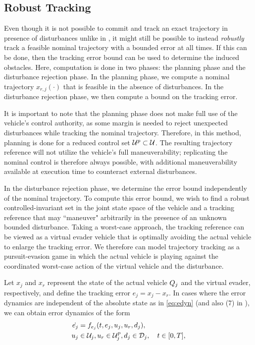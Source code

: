 \subsection{Robust Tracking} \label{sec:incomp_robust}
Even though it is not possible to commit and track an exact trajectory in presence of disturbances unlike in \cite{Chen15}, it might still be possible to instead \textit{robustly} track a feasible nominal trajectory with a bounded error at all times. If this can be done, then the tracking error bound can be used to determine the induced obstacles. Here, computation is done in two phases: the planning phase and the disturbance rejection phase. In the planning phase, we compute a nominal trajectory $x_{r,j}(\cdot)$ that is feasible in the absence of disturbances. In the disturbance rejection phase, we then compute a bound on the tracking error.

It is important to note that the planning phase does not make full use of the vehicle's control authority, as some margin is needed to reject unexpected disturbances while tracking the nominal trajectory. Therefore, in this method, planning is done for a reduced control set $\mathcal{U}^p\subset\mathcal{U}$. The resulting trajectory reference will not utilize the vehicle's full maneuverability; replicating the nominal control is therefore always possible, with additional maneuverability available at execution time to counteract external disturbances.

In the disturbance rejection phase, we determine the error bound independently of the nominal trajectory. To compute this error bound, we wish to find a robust controlled-invariant set in the joint state space of the vehicle and a tracking reference that may ``maneuver" arbitrarily in the presence of an unknown bounded disturbance. Taking a worst-case approach, the tracking reference can be viewed as a virtual evader vehicle that is optimally avoiding the actual vehicle to enlarge the tracking error. We therefore can model trajectory tracking as a pursuit-evasion game in which the actual vehicle is playing against the coordinated worst-case action of the virtual vehicle and the disturbance. 

Let $x_j$ and $x_r$ represent the state of the actual vehicle $Q_{j}$ and the virtual evader, respectively, and define the tracking error $e_j=x_j-x_r$. In cases where the error dynamics are independent of the absolute state as in \eqref{eq:edyn} (and also (7) in \cite{Mitchell05}), we can obtain error dynamics of the form
\begin{equation}
\label{eq:edyn} %
\begin{aligned}
\dot{e_j} &= f_{e_j}(t, e_j, u_j, u_r,d_j), \\
u_j &\in \cset_j, u_r\in\cset^p_j, d_j \in \dset_j, \quad t \in [0, T],
\end{aligned}
\end{equation}

